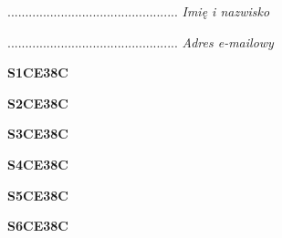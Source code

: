 \begin{turn}{90}\begin{minipage}{\linewidth} \vspace{20mm} ................................................  \textit{Imię i nazwisko}\end{minipage}\end{turn}

\begin{turn}{90}\begin{minipage}{\linewidth} \vspace{20mm} ................................................  \textit{Adres e-mailowy}\end{minipage}\end{turn}

\begin{turn}{90}\huge \begin{minipage}{\linewidth} \vspace{10mm}\textbf{S1CE38C}\end{minipage}\end{turn}

\begin{turn}{90}\huge \begin{minipage}{\linewidth} \vspace{10mm}\textbf{S2CE38C}\end{minipage}\end{turn}

\begin{turn}{90}\huge \begin{minipage}{\linewidth} \vspace{10mm}\textbf{S3CE38C}\end{minipage}\end{turn}

\begin{turn}{90}\huge \begin{minipage}{\linewidth} \vspace{10mm}\textbf{S4CE38C}\end{minipage}\end{turn}

\begin{turn}{90}\huge \begin{minipage}{\linewidth} \vspace{10mm}\textbf{S5CE38C}\end{minipage}\end{turn}

\begin{turn}{90}\huge \begin{minipage}{\linewidth} \vspace{10mm}\textbf{S6CE38C}\end{minipage}\end{turn}

